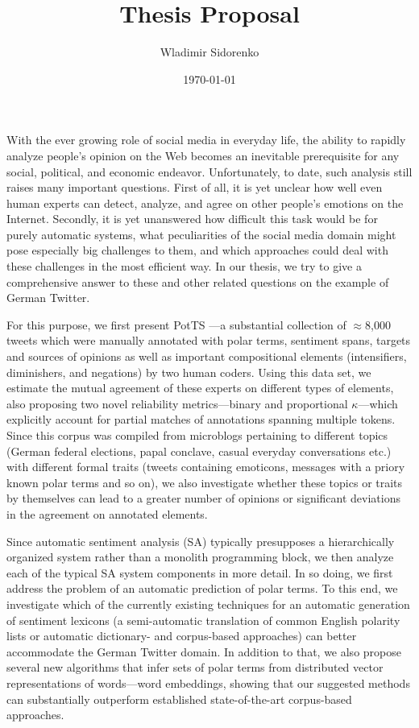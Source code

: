 \documentclass{article}
\title{Thesis Proposal}
\author{Wladimir Sidorenko}
\date{\today}
\begin{document}
\maketitle

With the ever growing role of social media in everyday life, the
ability to rapidly analyze people's opinion on the Web becomes an
inevitable prerequisite for any social, political, and economic
endeavor.  Unfortunately, to date, such analysis still raises many
important questions.  First of all, it is yet unclear how well even
human experts can detect, analyze, and agree on other people's
emotions on the Internet.  Secondly, it is yet unanswered how
difficult this task would be for purely automatic systems, what
peculiarities of the social media domain might pose especially big
challenges to them, and which approaches could deal with these
challenges in the most efficient way.  In our thesis, we try to give a
comprehensive answer to these and other related questions on the
example of German Twitter.

For this purpose, we first present PotTS \cite{Sidarenka:16}---a
substantial collection of $\approx$8,000 tweets which were manually
annotated with polar terms, sentiment spans, targets and sources of
opinions as well as important compositional elements (intensifiers,
diminishers, and negations) by two human coders.  Using this data set,
we estimate the mutual agreement of these experts on different types of
elements, also proposing two novel reliability metrics---binary and
proportional $\kappa$---which explicitly account for partial matches
of annotations spanning multiple tokens.  Since this corpus was
compiled from microblogs pertaining to different topics (German
federal elections, papal conclave, casual everyday conversations etc.)
with different formal traits (tweets containing emoticons, messages
with a priory known polar terms and so on), we also investigate
whether these topics or traits by themselves can lead to a greater
number of opinions or significant deviations in the agreement on
annotated elements.

Since automatic sentiment analysis (SA) typically presupposes a
hierarchically organized system rather than a monolith programming
block, we then analyze each of the typical SA system components in
more detail.  In so doing, we first address the problem of an
automatic prediction of polar terms.  To this end, we investigate
which of the currently existing techniques for an automatic generation
of sentiment lexicons (a semi-automatic translation of common English
polarity lists or automatic dictionary- and corpus-based approaches)
can better accommodate the German Twitter domain.  In addition to
that, we also propose several new algorithms that infer sets of polar
terms from distributed vector representations of words---word
embeddings, showing that our suggested methods can substantially
outperform established state-of-the-art corpus-based approaches.
\end{document}
